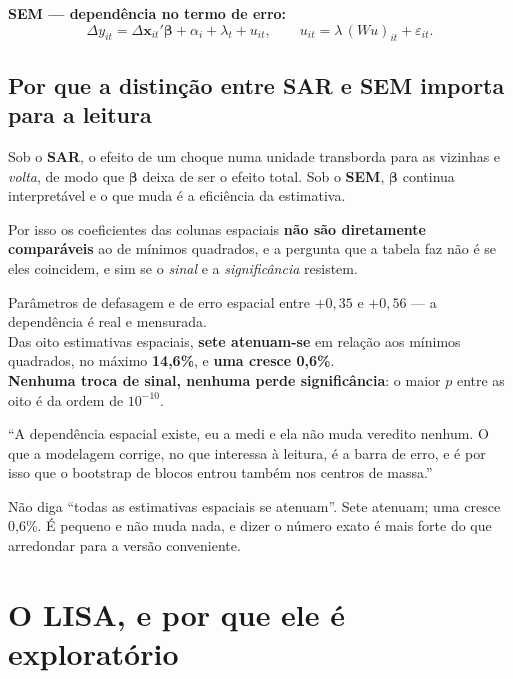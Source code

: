 \textbf{SEM --- dependência no termo de erro:}
\begin{equation}
\Delta y_{it} = \Delta \mathbf{x}_{it}' \boldsymbol{\beta} + \alpha_i + \lambda_t + u_{it},
\qquad u_{it} = \lambda\, (Wu)_{it} + \varepsilon_{it}.
\end{equation}

\subsection{Por que a distinção entre SAR e SEM importa para a leitura}

Sob o \textbf{SAR}, o efeito de um choque numa unidade transborda para as
vizinhas e \emph{volta}, de modo que $\boldsymbol{\beta}$ deixa de ser o efeito
total. Sob o \textbf{SEM}, $\boldsymbol{\beta}$ continua interpretável e o que
muda é a eficiência da estimativa.

Por isso os coeficientes das colunas espaciais \textbf{não são diretamente
comparáveis} ao de mínimos quadrados, e a pergunta que a tabela faz não é se
eles coincidem, e sim se o \emph{sinal} e a \emph{significância} resistem.

\begin{ancora}
Parâmetros de defasagem e de erro espacial entre $+0{,}35$ e $+0{,}56$
--- a dependência é real e mensurada. \\
Das oito estimativas espaciais, \textbf{sete atenuam-se} em relação aos mínimos
quadrados, no máximo \textbf{14,6\%}, e \textbf{uma cresce 0,6\%}. \\
\textbf{Nenhuma troca de sinal, nenhuma perde significância}: o maior $p$ entre
as oito é da ordem de $10^{-10}$.
\end{ancora}

\begin{nabanca}
``A dependência espacial existe, eu a medi e ela não muda veredito nenhum. O
que a modelagem corrige, no que interessa à leitura, é a barra de erro, e é
por isso que o bootstrap de blocos entrou também nos centros de massa.''
\end{nabanca}

\begin{armadilha}
Não diga ``todas as estimativas espaciais se atenuam''. Sete atenuam; uma cresce
0,6\%. É pequeno e não muda nada, e dizer o número exato é mais forte do que
arredondar para a versão conveniente.
\end{armadilha}

\section{O LISA, e por que ele é exploratório}

